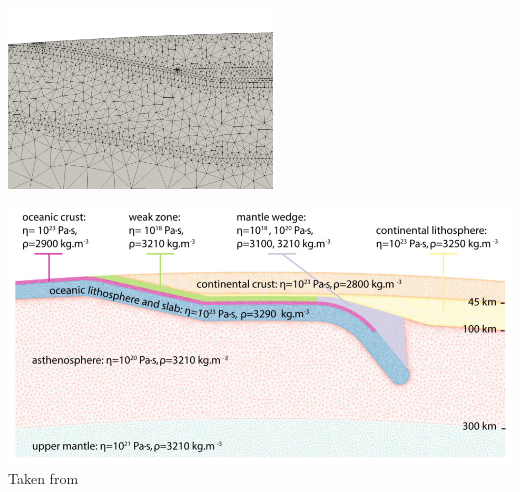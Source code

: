 \includegraphics[width=7cm]{python_codes/fieldstone_44/grid_lowres5}


\begin{center}
\includegraphics[width=14cm]{python_codes/fieldstone_44/sifg19}\\
{\captionfont Taken from \cite{sifg19}}
\end{center}

